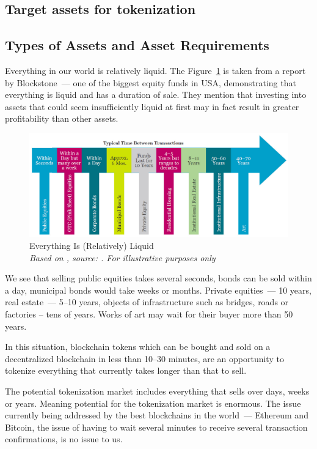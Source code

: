 \documentclass{article}
\begin{document}
\begin{multicols}{2}
\section{Target assets for tokenization}

\subsection{Types of Assets and Asset Requirements}

Everything in our world is relatively liquid. The Figure~\ref{fig:blackstone} is taken from a report \cite{blackstone2015} by Blockstone~--- one of the biggest equity funds in USA, demonstrating that everything is liquid and has a duration of sale. They mention that investing into assets that could seem insufficiently liquid at first may in fact result in greater profitability than other assets.

\begin{figure}
  \centering
  \includegraphics[width=\textwidth]{blackstone.png}
  \caption{Everything Is (Relatively) Liquid\\\textit{Based on \cite{blackstone2015}, source: \cite{ilmanen2011expected}. For illustrative purposes only}}
  \label{fig:blackstone}
\end{figure}

We see that selling public equities takes several seconds, bonds can be sold within a day, municipal bonds would take weeks or months. Private equities~--- 10 years, real estate~--- 5--10 years, objects of infrastructure such as bridges, roads or factories – tens of years. Works of art may wait for their buyer more than 50 years. 

In this situation, blockchain tokens which can be bought and sold on a decentralized blockchain in less than 10--30 minutes, are an opportunity to tokenize everything that currently takes longer than that to sell. 

The potential tokenization market includes everything that sells over days, weeks or years. Meaning potential for the tokenization market is enormous. The issue currently being addressed by the best blockchains in the world~--- Ethereum and Bitcoin, the issue of having to wait several minutes to receive several transaction confirmations, is no issue to us. 


\end{multicols}
\end{document}
